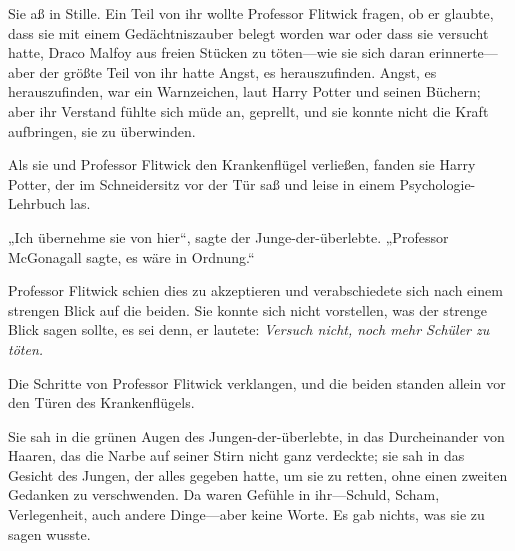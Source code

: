 Sie aß in Stille. Ein Teil von ihr wollte Professor Flitwick fragen, ob er glaubte, dass sie mit einem Gedächtniszauber belegt worden war oder dass sie versucht hatte, Draco Malfoy aus freien Stücken zu töten—wie sie sich daran erinnerte—aber der größte Teil von ihr hatte Angst, es herauszufinden. Angst, es herauszufinden, war ein Warnzeichen, laut Harry Potter und seinen Büchern; aber ihr Verstand fühlte sich müde an, geprellt, und sie konnte nicht die Kraft aufbringen, sie zu überwinden.

Als sie und Professor Flitwick den Krankenflügel verließen, fanden sie Harry Potter, der im Schneidersitz vor der Tür saß und leise in einem Psychologie-Lehrbuch las.

„Ich übernehme sie von hier“, sagte der Junge-der-überlebte. „Professor McGonagall sagte, es wäre in Ordnung.“

Professor Flitwick schien dies zu akzeptieren und verabschiedete sich nach einem strengen Blick auf die beiden. Sie konnte sich nicht vorstellen, was der strenge Blick sagen sollte, es sei denn, er lautete: \emph{Versuch nicht, noch mehr Schüler zu töten.}

Die Schritte von Professor Flitwick verklangen, und die beiden standen allein vor den Türen des Krankenflügels.

Sie sah in die grünen Augen des Jungen-der-überlebte, in das Durcheinander von Haaren, das die Narbe auf seiner Stirn nicht ganz verdeckte; sie sah in das Gesicht des Jungen, der alles gegeben hatte, um sie zu retten, ohne einen zweiten Gedanken zu verschwenden. Da waren Gefühle in ihr—Schuld, Scham, Verlegenheit, auch andere Dinge—aber keine Worte. Es gab nichts, was sie zu sagen wusste.

